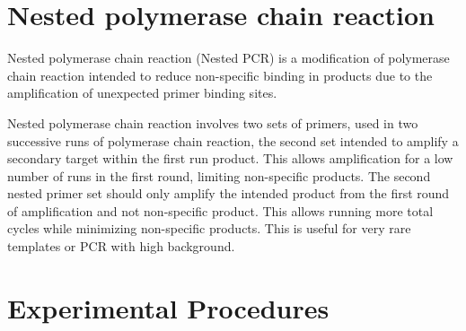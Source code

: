 \documentclass[]{book}
\theoremstyle{definition}
\theoremstyle{definition}
\theoremstyle{definition}
\theoremstyle{remark}
\begin{document}
\section{Nested polymerase chain
reaction}\label{nested-polymerase-chain-reaction}

Nested polymerase chain reaction (Nested PCR) is a modification of
polymerase chain reaction intended to reduce non-specific binding in
products due to the amplification of unexpected primer binding sites.

Nested polymerase chain reaction involves two sets of primers, used in
two successive runs of polymerase chain reaction, the second set
intended to amplify a secondary target within the first run product.
This allows amplification for a low number of runs in the first round,
limiting non-specific products. The second nested primer set should only
amplify the intended product from the first round of amplification and
not non-specific product. This allows running more total cycles while
minimizing non-specific products. This is useful for very rare templates
or PCR with high background.

\section{Experimental Procedures}\label{experimental-procedures-11}
\end{document}
